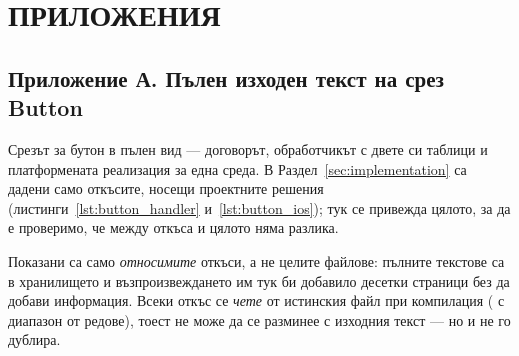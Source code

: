 {}
\section*{ПРИЛОЖЕНИЯ}
\label{sec:appendix}

\subsection*{Приложение А. Пълен изходен текст на срез Button}
Срезът за бутон в пълен вид --- договорът, обработчикът с двете си таблици и
платформената реализация за една среда. В Раздел~\ref{sec:implementation} са дадени само
откъсите, носещи проектните решения (листинги~\ref{lst:button_handler}
и~\ref{lst:button_ios}); тук се привежда цялото, за да е проверимо, че между откъса и
цялото няма разлика.

Показани са само \emph{относимите} откъси, а не целите файлове: пълните текстове са в
хранилището и възпроизвеждането им тук би добавило десетки страници без да добави
информация. Всеки откъс се \emph{чете} от истинския файл при компилация
( с диапазон от редове), тоест не може да се
разминее с изходния текст --- но и не го дублира.









